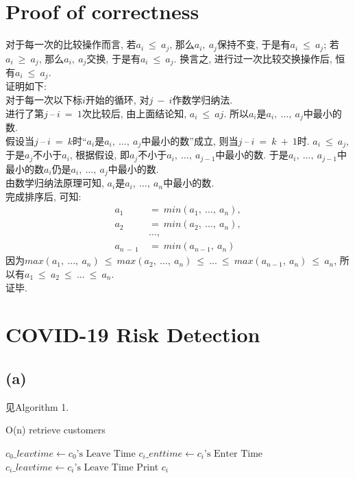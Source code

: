 \documentclass{article}
\begin{document}
\section{Proof of correctness}
对于每一次的比较操作而言, 若$a_i\ \leq\ a_j$, 那么$a_i,\ a_j$保持不变, 于是有$a_i\ \leq\ a_j$; 若$a_i\ \geq\ a_j$, 那么$a_i,\ a_j$交换, 于是有$a_i\ \leq\ a_j$. 换言之, 进行过一次比较交换操作后, 恒有$a_i\ \leq\ a_j$. \\
证明如下: \\
对于每一次以下标$i$开始的循环, 对$j\ -\ i$作数学归纳法. \\
进行了第$j\ –\ i\ =\ 1$次比较后, 由上面结论知, $a_i\ \leq \ aj$. 所以$a_i$是$a_i,\ …,\ a_j$中最小的数. \\
假设当$j\ –\ i\ =\ k $时“$a_i$是$a_i,\ …,\ a_j$中最小的数”成立, 则当$j\ –\ i\ =\ k\ +\ 1$时. $a_i\ \leq \ a_j$, 于是$a_j$不小于$a_i$, 根据假设, 即$a_j$不小于$a_i,\ …,\ a_{j - 1}$中最小的数. 于是$a_i,\ …,\ a_{j - 1}$中最小的数$a_i$仍是$a_i,\ …,\ a_j$中最小的数. \\
由数学归纳法原理可知, $a_i$是$a_i,\ …,\ a_n$中最小的数. \\
完成排序后, 可知: 
\begin{align*}
a_1\ & =\ min(a_1,\ …,\ a_n), \\
a_2\ & =\ min(a_2,\ …,\ a_n), \\
& …, \\ 
a_{n\ -\ 1}\ & =\ min(a_{n - 1},\ a_n)
\end{align*}
因为$max(a_1,\ …,\ a_n)\ \leq \ max(a_2,\ …,\ a_n)\ \leq \ ...\ \leq \ max(a_{n - 1},\ a_n)\ \leq \ a_n$,
所以有$a_1\ \leq \ a_2\ \leq \ ...\ \leq \ a_n$. \\
证毕.


\section{COVID-19 Risk Detection}
\subsection{(a)}
见Algorithm 1.

\begin{algorithm}
\caption{O(n) retrieve customers}
\begin{algorithmic}[1]
\State $c_0\_leavtime \gets \mbox{$c_0$'s Leave Time} $
\State $c_i\_enttime\gets \mbox{$c_i$'s Enter Time}$
\State $c_i\_leavtime\gets \mbox{$c_i$'s Leave Time}$
\State Print $c_i$
\EndIf
\EndFor
\EndProcedure
\end{algorithmic}
\end{algorithm}
\end{document}
